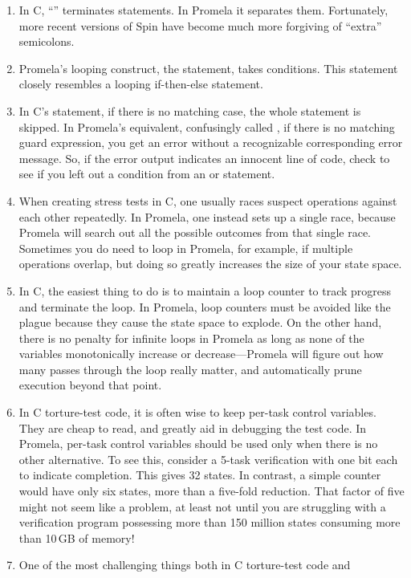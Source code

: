 \begin{enumerate}
\item	In C, ``\co{;}'' terminates statements.  In Promela it separates them.
	Fortunately, more recent versions of Spin have become
	much more forgiving of ``extra'' semicolons.
\item	Promela's looping construct, the  statement, takes
	conditions.
	This  statement closely resembles a looping if-then-else
	statement.
\item	In C's  statement, if there is no matching case, the whole
	statement is skipped.  In Promela's equivalent, confusingly called
	, if there is no matching guard expression, you get an error
	without a recognizable corresponding error message.
	So, if the error output indicates an innocent line of code,
	check to see if you left out a condition from an  or 
	statement.
\item	When creating stress tests in C, one usually races suspect operations
	against each other repeatedly.	In Promela, one instead sets up
	a single race, because Promela will search out all the possible
	outcomes from that single race.	Sometimes you do need to loop
	in Promela, for example, if multiple operations overlap, but
	doing so greatly increases the size of your state space.
\item	In C, the easiest thing to do is to maintain a loop counter to track
	progress and terminate the loop.  In Promela, loop counters
	must be avoided like the plague because they cause the state
	space to explode.  On the other hand, there is no penalty for
	infinite loops in Promela as long as none of the variables
	monotonically increase or decrease---Promela will figure out
	how many passes through the loop really matter, and automatically
	prune execution beyond that point.
\item	In C torture-test code, it is often wise to keep per-task control
	variables.  They are cheap to read, and greatly aid in debugging the
	test code.  In Promela, per-task control variables should be used
	only when there is no other alternative.  To see this, consider
	a 5-task verification with one bit each to indicate completion.
	This gives 32 states.  In contrast, a simple counter would have
	only six states, more than a five-fold reduction.  That factor
	of five might not seem like a problem, at least not until you
	are struggling with a verification program possessing more than
	150 million states consuming more than 10\,GB of memory!
\item	One of the most challenging things both in C torture-test code and

\end{enumerate}
